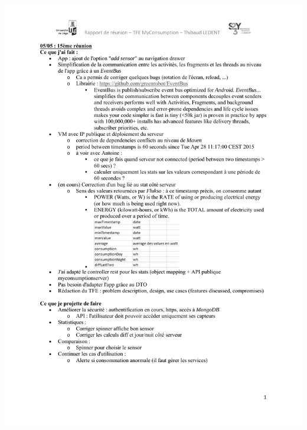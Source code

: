 \documentclass[a4paper, oneside, 11pt]{book}
\begin{document}
\includegraphics[width=1\textwidth]{reports_NB_Part16.pdf}
\newpage
\end{document}
